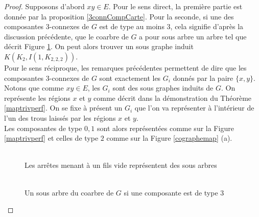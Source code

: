 \documentclass{scrartcl}
\begin{document}
\begin{flushleft}
\begin{proof}
    Supposons d'abord $xy \in E$. Pour le sens direct, la première partie est donnée par la proposition \ref{3connCompCarte}. Pour la seconde,
    si une des composantes $3$-connexes de $G$ est de type au moins $3$, cela signifie d'après la discussion précédente, que le coarbre de $G$
    a pour sous arbre un arbre tel que décrit Figure \ref{3conntype3}. On peut alors trouver un sous graphe induit $K(K_2, I(1, K_{2,2,2}))$.\\
    Pour le sens réciproque, les remarques précédentes permettent de dire que les composantes $3$-connexes de $G$ sont exactement les $G_i$
    donnés par la paire $\{x,y\}$. Notons que comme $xy \in E$, les $G_i$ sont des sous graphes induits de $G$. On représente les régions $x$ et
    $y$ comme décrit dans la démonstration du Théorème \ref{maptrivperf}. On se fixe à présent un $G_i$ que l'on va représenter à l'intérieur de
    l'un des trous laissés par les régions $x$ et $y$.\\
    Les composantes de type $0,1$ sont alors représentées comme sur la Figure \ref{maptrivperf} et celles de type $2$ comme sur la
    Figure \ref{cographemap} (a).
    \\~\\

    \begin{figure}[h]
        \caption{Un sous arbre du coarbre de $G$ si une composante est de type $3$}\label{3conntype3}
        \begin{center}
            Les arrêtes menant à un fils vide représentent des sous arbres
            \\~\\
\end{center}
\end{figure}
\end{proof}
\end{flushleft}
\end{document}
